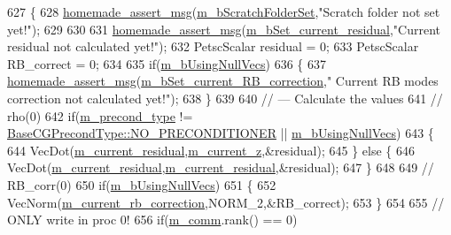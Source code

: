 \begin{DoxyCode}
627 \{
628     \hyperlink{common__header_8h_a593ccc80b790b2268653fcf6597bf451}{homemade\_assert\_msg}(\hyperlink{classcarl_1_1_f_e_t_i___operations_a8bb9de7de35a2f7d7d5982ae1085ba15}{m\_bScratchFolderSet},\textcolor{stringliteral}{"Scratch folder not set
       yet!"});
629 
630 
631     \hyperlink{common__header_8h_a593ccc80b790b2268653fcf6597bf451}{homemade\_assert\_msg}(\hyperlink{classcarl_1_1_f_e_t_i___operations_a1f1f890054d63bdf25937e6bf66fa5ce}{m\_bSet\_current\_residual},\textcolor{stringliteral}{"Current residual
       not calculated yet!"});
632     PetscScalar residual = 0;
633     PetscScalar RB\_correct = 0;
634 
635     \textcolor{keywordflow}{if}(\hyperlink{classcarl_1_1_f_e_t_i___operations_aff68699ccceb6e1debc4ecab97dde2ff}{m\_bUsingNullVecs})
636     \{
637         \hyperlink{common__header_8h_a593ccc80b790b2268653fcf6597bf451}{homemade\_assert\_msg}(\hyperlink{classcarl_1_1_f_e_t_i___operations_a4ba412e4dc2d64b62ebcf81773ed5ce8}{m\_bSet\_current\_RB\_correction},\textcolor{stringliteral}{"
      Current RB modes correction not calculated yet!"});
638     \}
639 
640     \textcolor{comment}{// --- Calculate the values}
641     \textcolor{comment}{// rho(0)}
642     \textcolor{keywordflow}{if}(\hyperlink{classcarl_1_1_f_e_t_i___operations_a76e474f6c1b8bb99cee6a6645f15b25b}{m\_precond\_type} != \hyperlink{namespacecarl_ad52f21755b51ffa926038b59ae194ea8ad142a27fc7dfef6e36c5d01689880cc4}{BaseCGPrecondType::NO\_PRECONDITIONER}
       || \hyperlink{classcarl_1_1_f_e_t_i___operations_aff68699ccceb6e1debc4ecab97dde2ff}{m\_bUsingNullVecs})
643     \{
644         VecDot(\hyperlink{classcarl_1_1_f_e_t_i___operations_a6b1154885f5b8303ecbd32ea76df40e5}{m\_current\_residual},\hyperlink{classcarl_1_1_f_e_t_i___operations_a56038a186d124078ad4b37c631f50ff0}{m\_current\_z},&residual);
645     \} \textcolor{keywordflow}{else} \{
646         VecDot(\hyperlink{classcarl_1_1_f_e_t_i___operations_a6b1154885f5b8303ecbd32ea76df40e5}{m\_current\_residual},\hyperlink{classcarl_1_1_f_e_t_i___operations_a6b1154885f5b8303ecbd32ea76df40e5}{m\_current\_residual},&residual);
647     \}
648 
649     \textcolor{comment}{// RB\_corr(0)}
650     \textcolor{keywordflow}{if}(\hyperlink{classcarl_1_1_f_e_t_i___operations_aff68699ccceb6e1debc4ecab97dde2ff}{m\_bUsingNullVecs})
651     \{
652         VecNorm(\hyperlink{classcarl_1_1_f_e_t_i___operations_a482c32e0a89fe4c8aca206ec4e04c67a}{m\_current\_rb\_correction},NORM\_2,&RB\_correct);
653     \}
654 
655     \textcolor{comment}{// ONLY write in proc 0!}
656     \textcolor{keywordflow}{if}(\hyperlink{classcarl_1_1_f_e_t_i___operations_a8cb0ed286667fc9f3ebc2d8ef2a3e13b}{m\_comm}.rank() == 0)

\end{DoxyCode}
